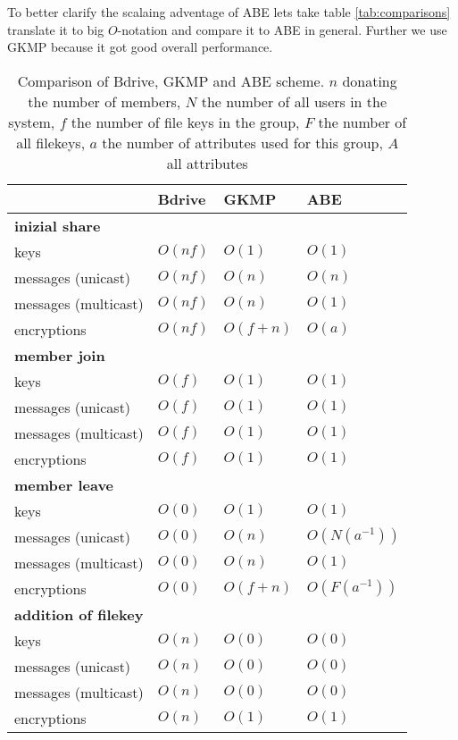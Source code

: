 To better clarify the scalaing adventage of ABE lets take table \ref{tab:comparisons} translate it to big $O$-notation and compare it to ABE in general. Further we use GKMP because it got good overall performance.

\begin{table*}[!ht]
\centering
\begin{tabular}{l 		| l 						| l 						| l }
 						& \textbf{Bdrive}			& \textbf{GKMP} 			& \textbf{ABE} 		\\
\hline
\textbf{inizial share} 																				\\
keys 					& $O(nf)$ 					& $O(1)$	 				& $O(1)$			\\
messages (unicast)		& $O(nf)$  					& $O(n)$					& $O(n)$			\\
messages (multicast) 	& $O(nf)$ 					& $O(n)$ 					& $O(1)$			\\
encryptions				& $O(nf)$ 					& $O(f + n)$				& $O(a)$ 			\\
\hline
\textbf{member join} 																				\\
keys 					& $O(f)$   					& $O(1)$					& $O(1)$			\\
messages (unicast)		& $O(f)$  					& $O(1)$  					& $O(1)$ 			\\
messages (multicast) 	& $O(f)$ 	 				& $O(1)$					& $O(1)$ 			\\
encryptions				& $O(f)$  					& $O(1)$					& $O(1)$ 			\\
\hline
\textbf{member leave}																				\\
keys 					& $O(0)$					& $O(1)$					& $O(1)$			\\
messages (unicast)		& $O(0)$					& $O(n)$  					& $O(N(a^{-1}))$	\\
messages (multicast)	& $O(0)$					& $O(n)$					& $O(1)$ 			\\ 
encryptions 			& $O(0)$					& $O(f + n)$ 				& $O(F(a^{-1}))$	\\
\hline	
\textbf{addition of filekey}																		\\
keys 					& $O(n)$	 				& $O(0)$					& $O(0)$			\\
messages (unicast)		& $O(n)$	 				& $O(0)$					& $O(0)$			\\
messages (multicast)	& $O(n)$ 					& $O(0)$ 					& $O(0)$			\\
encryptions				& $O(n)$ 					& $O(1)$					& $O(1)$			\\
\hline
\end{tabular}
\caption{Comparison of Bdrive, GKMP and ABE scheme. $n$ donating the number of members, $N$ the number of all users in the system, $f$ the number of file keys in the group, $F$ the number of all filekeys, $a$ the number of attributes used for this group, $A$ all attributes }
\label{tab:comparisonsOWFTtoABE}
\end{table*}

